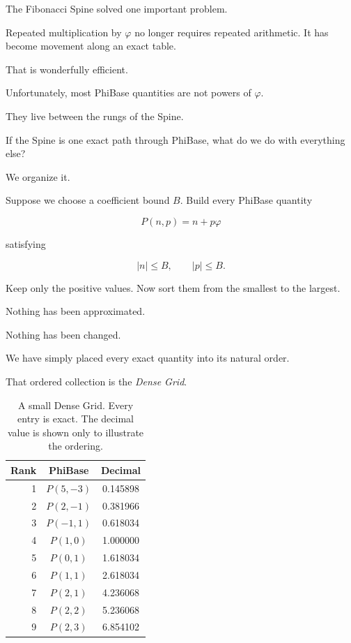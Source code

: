 \label{stone:densegrid}

The Fibonacci Spine solved one important problem.

Repeated multiplication by \(\varphi\) no longer requires repeated arithmetic. It has become movement along an exact table.

That is wonderfully efficient.

Unfortunately, most PhiBase quantities are not powers of \(\varphi\).

They live between the rungs of the Spine.

If the Spine is one exact path through PhiBase, what do we do with everything else?

We organize it.

Suppose we choose a coefficient bound \(B\). Build every PhiBase quantity

\[
P(n,p)=n+p\varphi
\]

satisfying

\[
|n|\le B,
\qquad
|p|\le B.
\]

Keep only the positive values. Now sort them from the smallest to the largest.

Nothing has been approximated.

Nothing has been changed.

We have simply placed every exact quantity into its natural order.

That ordered collection is the \emph{Dense Grid}.

\begin{table}[htbp]
\centering
\caption{A small Dense Grid. Every entry is exact. The decimal value is shown only to illustrate the ordering.}
\label{tab:densegrid}
\begin{tabular}{rcc}
\hline
Rank & PhiBase & Decimal\\
\hline
1 & $P(5,-3)$ & 0.145898\\
2 & $P(2,-1)$ & 0.381966\\
3 & $P(-1,1)$ & 0.618034\\
4 & $P(1,0)$ & 1.000000\\
5 & $P(0,1)$ & 1.618034\\
6 & $P(1,1)$ & 2.618034\\
7 & $P(2,1)$ & 4.236068\\
8 & $P(2,2)$ & 5.236068\\
9 & $P(2,3)$ & 6.854102\\
\hline
\end{tabular}
\end{table}


